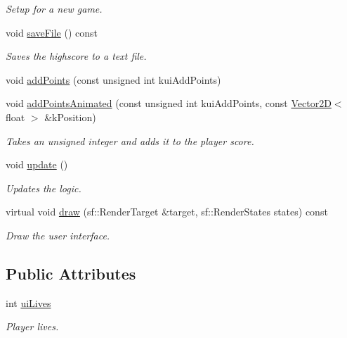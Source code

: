 \begin{DoxyCompactItemize}
\begin{DoxyCompactList}\small\item\em Setup for a new game. \end{DoxyCompactList}\item 
void \hyperlink{class_u_i_manager_a910958d4ba0efde343fdaa041f550acd}{save\+File} () const 
\begin{DoxyCompactList}\small\item\em Saves the highscore to a text file. \end{DoxyCompactList}\item 
void \hyperlink{class_u_i_manager_a783b2d2f87f16ea45875114f92856950}{add\+Points} (const unsigned int kui\+Add\+Points)
\item 
void \hyperlink{class_u_i_manager_a721a50436f0c9584b19ee646b407289e}{add\+Points\+Animated} (const unsigned int kui\+Add\+Points, const \hyperlink{class_vector2_d}{Vector2\+D}$<$ float $>$ \&k\+Position)
\begin{DoxyCompactList}\small\item\em Takes an unsigned integer and adds it to the player score. \end{DoxyCompactList}\item 
\hypertarget{class_u_i_manager_a12ed6f32d28d232782c5bdbbb09b3c9f}{void \hyperlink{class_u_i_manager_a12ed6f32d28d232782c5bdbbb09b3c9f}{update} ()}\label{class_u_i_manager_a12ed6f32d28d232782c5bdbbb09b3c9f}

\begin{DoxyCompactList}\small\item\em Updates the logic. \end{DoxyCompactList}\item 
virtual void \hyperlink{class_u_i_manager_a5b561519f60c7b5e59c010794715b564}{draw} (sf\+::\+Render\+Target \&target, sf\+::\+Render\+States states) const 
\begin{DoxyCompactList}\small\item\em Draw the user interface. \end{DoxyCompactList}\end{DoxyCompactItemize}
\subsection*{Public Attributes}
\begin{DoxyCompactItemize}
\item 
\hypertarget{class_u_i_manager_a126f5ffe70cdd465e492f7af57c00b1e}{int \hyperlink{class_u_i_manager_a126f5ffe70cdd465e492f7af57c00b1e}{ui\+Lives}}\label{class_u_i_manager_a126f5ffe70cdd465e492f7af57c00b1e}

\begin{DoxyCompactList}\small\item\em Player lives. \end{DoxyCompactList}\end{DoxyCompactItemize}


